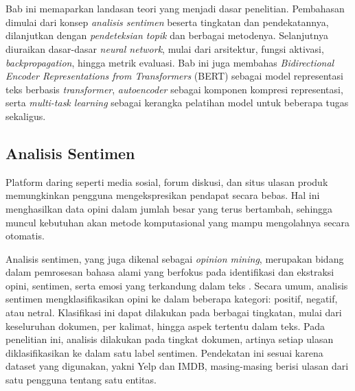 \chapter{\babDua}

Bab ini memaparkan landasan teori yang menjadi dasar penelitian.
Pembahasan dimulai dari konsep \textit{analisis sentimen} beserta tingkatan
dan pendekatannya, dilanjutkan dengan \textit{pendeteksian topik} dan berbagai
metodenya. Selanjutnya diuraikan dasar-dasar \textit{neural network}, mulai
dari arsitektur, fungsi aktivasi, \textit{backpropagation}, hingga metrik
evaluasi. Bab ini juga membahas \textit{Bidirectional Encoder Representations
from Transformers} (BERT) sebagai model representasi teks berbasis
\textit{transformer}, \textit{autoencoder} sebagai komponen kompresi
representasi, serta \textit{multi-task learning} sebagai kerangka pelatihan
model untuk beberapa tugas sekaligus.

\section{Analisis Sentimen}

Platform daring seperti media sosial, forum diskusi, dan situs ulasan
produk memungkinkan pengguna mengekspresikan pendapat secara bebas.
Hal ini menghasilkan data opini dalam jumlah besar yang terus bertambah,
sehingga muncul kebutuhan akan metode komputasional yang mampu
mengolahnya secara otomatis.

Analisis sentimen, yang juga dikenal sebagai \textit{opinion mining},
merupakan bidang dalam pemrosesan bahasa alami yang berfokus pada
identifikasi dan ekstraksi opini, sentimen, serta emosi yang terkandung
dalam teks \parencite{liu2012sentiment}. Secara umum, analisis sentimen
mengklasifikasikan opini ke dalam beberapa kategori: positif, negatif,
atau netral. Klasifikasi ini dapat dilakukan pada berbagai tingkatan,
mulai dari keseluruhan dokumen, per kalimat, hingga aspek tertentu dalam
teks. Pada penelitian ini, analisis dilakukan pada tingkat dokumen,
artinya setiap ulasan diklasifikasikan ke dalam satu label sentimen.
Pendekatan ini sesuai karena dataset yang digunakan, yakni Yelp dan IMDB,
masing-masing berisi ulasan dari satu pengguna tentang satu entitas.

